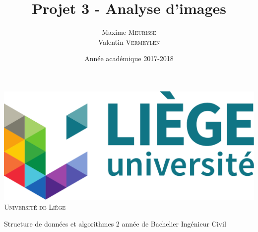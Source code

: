 \documentclass[a4paper, 12pt]{article}
\title{Projet 3 - Analyse d'images}
\author{
	Maxime \textsc{Meurisse}\\Valentin \textsc{Vermeylen}\\
}
\date{Année académique 2017-2018}
\newcommand{\subtitle}{Structure de données et algorithmes}
\newcommand{\context}{2\ieme{} année de Bachelier Ingénieur Civil}
\begin{document}
	\makeatletter
	\begin{titlepage}
		\begin{minipage}[t][0.425\textheight][t]{\textwidth}
			\begin{center}
				\includegraphics[height=0.15\textheight]{resources/pdf/logo-uliege.pdf}
				\vfill
				{\huge \textsc{Université de Liège}}
				\vfill
			\end{center}
		\end{minipage}
		\vfill
		\begin{minipage}{\textwidth}
			\hspace{6pt}
			\begin{mdframed}[linewidth = 2pt, innertopmargin = 12pt, innerbottommargin = 12pt, leftline = false, rightline = false]
				\begin{center}
					{\huge \bfseries \@title}
				\end{center}
			\end{mdframed}
			\hspace{6pt}
		\end{minipage}
		\vfill
		\begin{minipage}[b][0.425\textheight][t]{\textwidth}
			\begin{center}
				{\LARGE \subtitle}
				\vfill
				{\large \@author\space}
				\vfill
				{\large \context \\[6pt] \@date}
			\end{center}
		\end{minipage}
	\end{titlepage}
	\makeatother
	\restoregeometry
	
\end{document}
